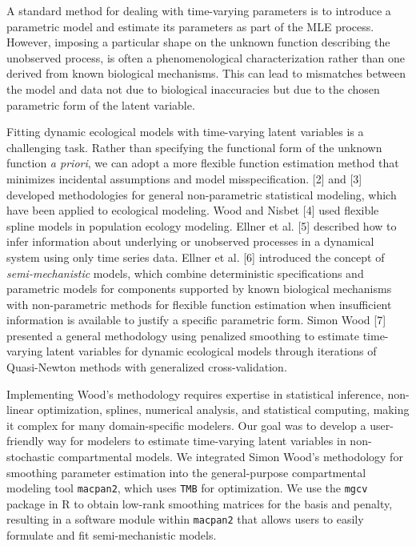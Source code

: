 \documentclass[
11pt, %
oneside, %
english, %
singlespacing, %
]{macthesis} %
\begin{document}
A standard method for dealing with time-varying parameters is to introduce a parametric model and estimate its parameters as part of the MLE process. However, imposing a particular shape on the unknown function describing the unobserved process, is often a phenomenological characterization rather than one derived from known biological mechanisms. This can lead to mismatches between the model and data not due to biological inaccuracies but due to the chosen parametric form of the latent variable.

Fitting dynamic ecological models with time-varying latent variables is a challenging task. Rather than specifying the functional form of the unknown function \emph{a priori}, we can adopt a more flexible function estimation method that minimizes incidental assumptions and model misspecification. {[}2{]} and {[}3{]} developed methodologies for general non-parametric statistical modeling, which have been applied to ecological modeling. Wood and Nisbet {[}4{]} used flexible spline models in population ecology modeling. Ellner et al. {[}5{]} described how to infer information about underlying or unobserved processes in a dynamical system using only time series data. Ellner et al. {[}6{]} introduced the concept of \emph{semi-mechanistic} models, which combine deterministic specifications and parametric models for components supported by known biological mechanisms with non-parametric methods for flexible function estimation when insufficient information is available to justify a specific parametric form. Simon Wood {[}7{]} presented a general methodology using penalized smoothing to estimate time-varying latent variables for dynamic ecological models through iterations of Quasi-Newton methods with generalized cross-validation.

Implementing Wood's methodology requires expertise in statistical inference, non-linear optimization, splines, numerical analysis, and statistical computing, making it complex for many domain-specific modelers. Our goal was to develop a user-friendly way for modelers to estimate time-varying latent variables in non-stochastic compartmental models. We integrated Simon Wood's methodology for smoothing parameter estimation into the general-purpose compartmental modeling tool \texttt{macpan2}, which uses \texttt{TMB} for optimization. We use the \texttt{mgcv} package in R to obtain low-rank smoothing matrices for the basis and penalty, resulting in a software module within \texttt{macpan2} that allows users to easily formulate and fit semi-mechanistic models.
\end{document}
